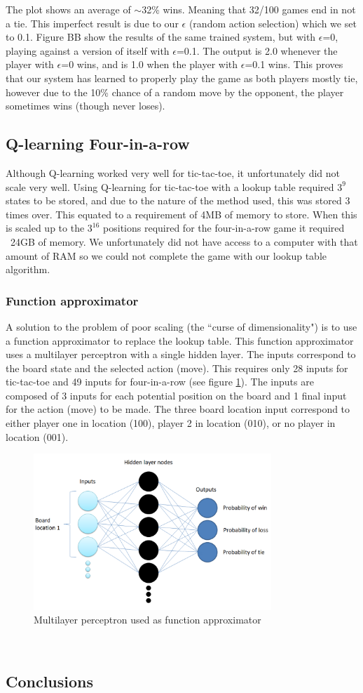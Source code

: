\documentclass[12pt,a4paper]{article}
\begin{document}
The plot shows an average of $\sim$32\% wins. Meaning that 32/100 games end in not a tie. This imperfect result is due to our $\epsilon$ (random action selection) which we set to 0.1. Figure BB show the results of the same trained system, but with $\epsilon$=0, playing against a version of itself with $\epsilon$=0.1.
The output is 2.0 whenever the player with $\epsilon$=0 wins, and is 1.0 when the player with $\epsilon$=0.1 wins. This proves that our system has learned to properly play the game as both players mostly tie, however due to the 10\% chance of a random move by the opponent, the player sometimes wins (though never loses).
\subsection*{Q-learning Four-in-a-row}
Although Q-learning worked very well for tic-tac-toe, it unfortunately did not scale very well. Using Q-learning for tic-tac-toe with a lookup table required $3^{9}$ states to be stored, and due to the nature of the method used, this was stored 3 times over. This equated to a requirement of 4MB of memory to store. When this is scaled up to the $3^{16}$ positions required for the four-in-a-row game it required ~24GB of memory. We unfortunately did not have access to a computer with that amount of RAM so we could not complete the game with our lookup table algorithm.
\subsubsection*{Function approximator}
A solution to the problem of poor scaling (the ``curse of dimensionality") is to use a function approximator to replace the lookup table. This function approximator uses a multilayer perceptron with a single hidden layer. The inputs correspond to the board state and the selected action (move). This requires only 28 inputs for tic-tac-toe and 49 inputs for four-in-a-row (see figure \ref{fig:funcApproxFigure}). The inputs are composed of 3 inputs for each potential position on the board and 1 final input for the action (move) to be made. The three board location input correspond to either player one in location (100), player 2 in location (010), or no player in location (001).\\
\begin{figure}[h]
\centering
\includegraphics[width=0.8\textwidth]{Figures/functionApproxFigure.png}
\caption{Multilayer perceptron used as function approximator}
\label{fig:funcApproxFigure}
\end{figure}\\
\pagebreak
\subsection*{Conclusions}
\end{document}
